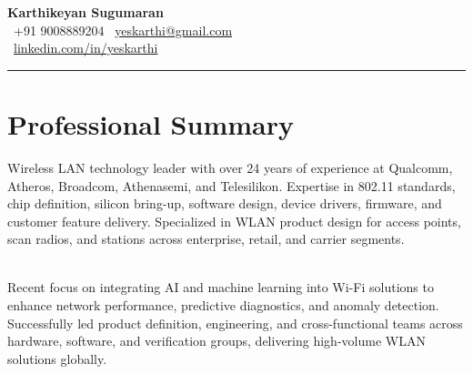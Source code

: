 \documentclass[a4paper,11pt]{article}
\newcommand{\contactinfo}[3]{\faPhone~#1 \quad \faEnvelope~\href{mailto:#2}{#2} \quad \faMapMarker*~#3}
\begin{document}
\begin{center}
    {\Huge \textbf{Karthikeyan Sugumaran}} \\
    \vspace{5pt}
    \contactinfo{+91 9008889204}{yeskarthi@gmail.com}{} \\
    \faLinkedin\ \href{https://www.linkedin.com/in/yeskarthi/}{linkedin.com/in/yeskarthi} \\
    \vspace{10pt}
\end{center}

\noindent\rule{\textwidth}{0.4pt}
\vspace{10pt}



\section*{Professional Summary}
\begin{flushleft}
    Wireless LAN technology leader with over 24 years of experience at Qualcomm, Atheros, Broadcom, Athenasemi, and Telesilikon. Expertise in 802.11 standards, chip definition, silicon bring-up, software design, device drivers, firmware, and customer feature delivery. Specialized in WLAN product design for access points, scan radios, and stations across enterprise, retail, and carrier segments. 

    \mbox{} \\

    Recent focus on integrating AI and machine learning into Wi-Fi solutions to enhance network performance, predictive diagnostics, and anomaly detection. Successfully led product definition, engineering, and cross-functional teams across hardware, software, and verification groups, delivering high-volume WLAN solutions globally.
\end{flushleft}

\mbox{} \\

\end{document}
